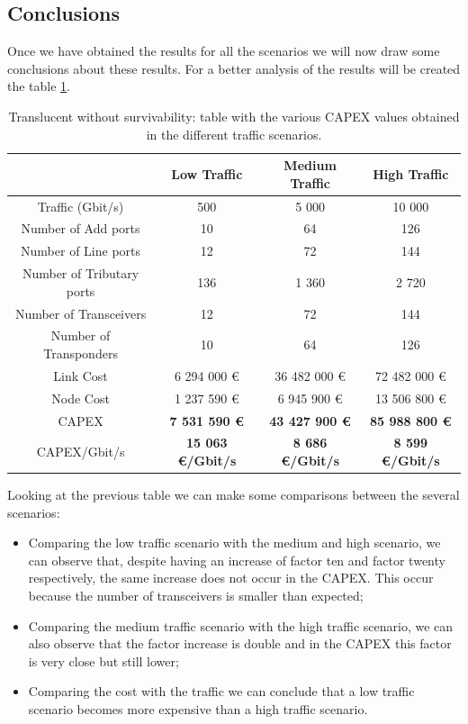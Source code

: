 \subsection{Conclusions}

Once we have obtained the results for all the scenarios we will now draw some conclusions about these results. For a better analysis of the results will be created the table \ref{table_comparative_transluc_surv}.

\begin{table}[h!]
\centering
\begin{tabular}{| c | c | c | c |}
 \hline
  & Low Traffic & Medium Traffic  & High Traffic \\
 \hline\hline
 Traffic (Gbit/s) & 500 & 5 000 & 10 000 \\ \hline
 Number of Add ports & 10 & 64 & 126 \\ \hline
 Number of Line ports & 12 & 72 & 144 \\ \hline
 Number of Tributary ports & 136 & 1 360 & 2 720 \\ \hline
 Number of Transceivers & 12 & 72 & 144 \\ \hline
 Number of Transponders & 10 & 64 & 126 \\ \hline
 Link Cost & 6 294 000 \euro & 36 482 000 \euro & 72 482 000 \euro \\ \hline
 Node Cost & 1 237 590 \euro & 6 945 900 \euro & 13 506 800 \euro \\ \hline
 CAPEX & \textbf{7 531 590 \euro} & \textbf{43 427 900 \euro} & \textbf{85 988 800 \euro} \\ \hline
 CAPEX/Gbit/s & \textbf{15 063 \euro/Gbit/s} & \textbf{8 686 \euro/Gbit/s} & \textbf{8 599 \euro/Gbit/s}\\
 \hline
\end{tabular}
\caption{Translucent without survivability: table with the various CAPEX values obtained in the different traffic scenarios.}
\label{table_comparative_transluc_surv}
\end{table}
\newpage
Looking at the previous table we can make some comparisons between the several scenarios:

\begin{itemize}
    \item Comparing the low traffic scenario with the medium and high scenario, we can observe that, despite having an increase of factor ten and factor twenty respectively, the same increase does not occur in the CAPEX. This occur because the number of transceivers is smaller than expected;
    \item Comparing the medium traffic scenario with the high traffic scenario, we can also observe that the factor increase is double and in the CAPEX this factor is very close but still lower;
    \item Comparing the cost with the traffic we can conclude that a low traffic scenario becomes more expensive than a high traffic scenario.
\end{itemize}
